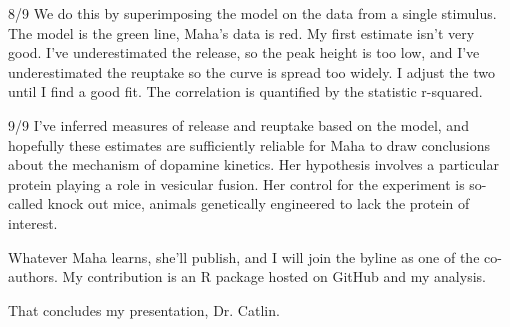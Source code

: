 \documentclass[11pt]{article}
\begin{document}
8/9
We do this by superimposing the model on the data from a single
stimulus. The model is the green line, Maha's data is red. My first
estimate isn't very good. I've underestimated the release, so the peak
height is too low, and I've underestimated the reuptake so the curve
is spread too widely. I adjust the two until I find a good fit. The
correlation is quantified by the statistic r-squared.

9/9
I've inferred measures of release and reuptake based on the model, and
hopefully these estimates are sufficiently reliable for Maha to draw
conclusions about the mechanism of dopamine kinetics. Her hypothesis
involves a particular protein playing a role in vesicular fusion. Her
control for the experiment is so-called knock out mice, animals
genetically engineered to lack the protein of interest.

Whatever Maha learns, she'll publish, and I will join the byline as
one of the co-authors. My contribution is an R package hosted on
GitHub and my analysis.

That concludes my presentation, Dr. Catlin.
\end{document}
